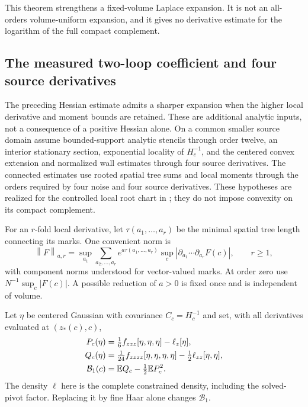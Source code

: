 \documentclass[11pt,oneside,openany]{book}
\theoremstyle{definition}
\theoremstyle{remark}
\newcommand{\E}{\mathbb E}
\newcommand{\norm}[1]{\left\lVert#1\right\rVert}
\newcommand{\abs}[1]{\left\lvert#1\right\rvert}
\newcommand{\src}[2]{\cite[#2]{#1}}
\begin{document}
This theorem strengthens a fixed-volume Laplace expansion. It is not
an all-orders volume-uniform expansion, and it gives no derivative
estimate for the logarithm of the full compact complement.

\subsection{The measured two-loop coefficient and four source derivatives}
\label{sec:measured-two-loop}
The preceding Hessian estimate admits a sharper expansion when the
higher local derivative and moment bounds are retained. These are
additional analytic inputs, not a consequence of a positive Hessian
alone. On a common smaller source domain assume bounded-support
analytic stencils through order twelve, an interior stationary section,
exponential locality of $H_c^{-1}$, and the centered convex extension
and normalized wall estimates through four source derivatives. The
connected estimates use rooted spatial tree sums and local moments
through the orders required by four noise and four source derivatives.
These hypotheses are realized for the controlled local root chart in
\src{SM}{V7}; they do not impose convexity on its compact complement.

For an $r$-fold local derivative, let $\tau(a_1,\ldots,a_r)$ be the
minimal spatial tree length connecting its marks. One convenient norm is
\begin{equation}
 \norm{F}_{a,r}=
 \sup_{a_1}\sum_{a_2,\ldots,a_r}
 e^{a\tau(a_1,\ldots,a_r)}\sup_c
 \abs{\partial_{a_1}\cdots\partial_{a_r}F(c)},\qquad r\ge1,
 \label{eq:two-loop-mark-norm}
\end{equation}
with component norms understood for vector-valued marks. At order zero
use $N^{-1}\sup_c|F(c)|$. A possible reduction of $a>0$ is fixed once
and is independent of volume.

Let $\eta$ be centered Gaussian with covariance $C_c=H_c^{-1}$ and
set, with all derivatives evaluated at $(z_*(c),c)$,
\begin{align}
 P_c(\eta)&=\tfrac16 f_{zzz}[\eta,\eta,\eta]-\ell_z[\eta],\notag\\
 Q_c(\eta)&=\tfrac1{24}f_{zzzz}[\eta,\eta,\eta,\eta]
                                  -\tfrac12\ell_{zz}[\eta,\eta],\notag\\
 \mathcal B_1(c)&=\E Q_c-\tfrac12\E P_c^2.
 \label{eq:measured-two-loop-coefficient}
\end{align}
The density $\ell$ here is the complete constrained density, including
the solved-pivot factor. Replacing it by fine Haar alone changes
$\mathcal B_1$.
\end{document}
